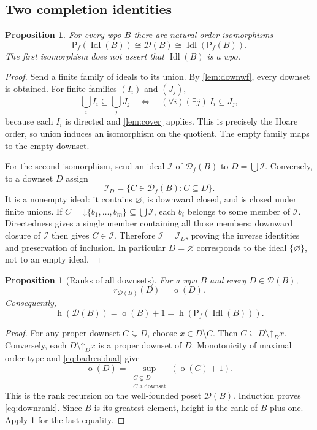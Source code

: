 \documentclass[11pt,letterpaper]{article}
\theoremstyle{teal}
\newtheorem{proposition}[theorem]{Proposition}
\theoremstyle{definition}
\newcommand{\Pf}{\mathsf P_{\!f}}
\newcommand{\Df}{\mathcal D_{\!f}}
\newcommand{\Down}{\mathcal D}
\newcommand{\Idl}{\operatorname{Idl}}
\newcommand{\hgt}{\operatorname{h}}
\newcommand{\mot}{\operatorname{o}}
\newcommand{\up}{\mathord\uparrow}
\newcommand{\dn}{\mathord\downarrow}
\begin{document}
\subsection{Two completion identities}
\begin{proposition}\label{prop:commute}
For every wpo $B$ there are natural order isomorphisms
\begin{equation}\label{eq:ideal-powerset}
 \Pf(\Idl(B))\cong\Down(B)\cong\Idl(\Pf(B)).
\end{equation}
The first isomorphism does not assert that $\Idl(B)$ is a wpo.
\end{proposition}
\begin{proof}
Send a finite family of ideals to its union. By \cref{lem:downwf}, every downset is obtained. For finite families $(I_i)$ and $(J_j)$,
\[
 \bigcup_i I_i\subseteq\bigcup_j J_j
 \quad\Longleftrightarrow\quad
 (\forall i)(\exists j)\ I_i\subseteq J_j,
\]
because each $I_i$ is directed and \cref{lem:cover} applies. This is precisely the Hoare order, so union induces an isomorphism on the quotient. The empty family maps to the empty downset.

For the second isomorphism, send an ideal $\mathcal I$ of $\Df(B)$ to $D=\bigcup\mathcal I$. Conversely, to a downset $D$ assign
\[
 \mathcal I_D=\{C\in\Df(B):C\subseteq D\}.
\]
It is a nonempty ideal: it contains $\varnothing$, is downward closed, and is closed under finite unions. If $C=\dn\{b_1,\ldots,b_m\}\subseteq\bigcup\mathcal I$, each $b_i$ belongs to some member of $\mathcal I$. Directedness gives a single member containing all those members; downward closure of $\mathcal I$ then gives $C\in\mathcal I$. Therefore $\mathcal I=\mathcal I_D$, proving the inverse identities and preservation of inclusion. In particular $D=\varnothing$ corresponds to the ideal $\{\varnothing\}$, not to an empty ideal.
\end{proof}

\begin{proposition}[Ranks of all downsets]\label{prop:downrank}
For a wpo $B$ and every $D\in\Down(B)$,
\begin{equation}\label{eq:downrank}
 r_{\Down(B)}(D)=\mot(D).
\end{equation}
Consequently,
\begin{equation}\label{eq:downheight}
 \hgt(\Down(B))=\mot(B)+1
 =\hgt(\Pf(\Idl(B))).
\end{equation}
\end{proposition}
\begin{proof}
For any proper downset $C\subsetneq D$, choose $x\in D\setminus C$. Then $C\subseteq D\setminus\up_Dx$. Conversely, each $D\setminus\up_Dx$ is a proper downset of $D$. Monotonicity of maximal order type and \eqref{eq:badresidual} give
\[
 \mot(D)=\sup_{\substack{C\subsetneq D\\C\text{ a downset}}}(\mot(C)+1).
\]
This is the rank recursion on the well-founded poset $\Down(B)$. Induction proves \eqref{eq:downrank}. Since $B$ is its greatest element, height is the rank of $B$ plus one. Apply \cref{prop:commute} for the last equality.
\end{proof}
\end{document}
